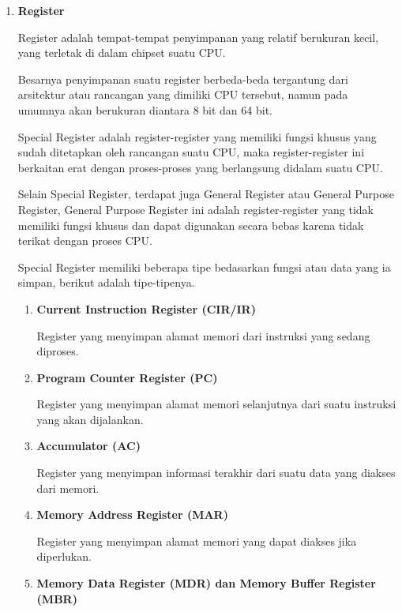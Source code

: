 \begin{enumerate}[label=\alph*.]

  \item \textbf{Register}

    Register adalah tempat-tempat penyimpanan yang relatif berukuran kecil,
    yang terletak di dalam chipset suatu CPU.

    Besarnya penyimpanan suatu register berbeda-beda tergantung dari
    arsitektur atau rancangan yang dimiliki CPU tersebut, namun pada
    umumnya akan berukuran diantara 8 bit dan 64 bit.

    Special Register adalah register-register yang memiliki fungsi khusus yang
    sudah ditetapkan oleh rancangan suatu CPU, maka register-register ini
    berkaitan erat dengan proses-proses yang berlangsung didalam suatu CPU.

    Selain Special Register, terdapat juga General Register atau General Purpose
    Register, General Purpose Register ini adalah register-register yang tidak
    memiliki fungsi khusus dan dapat digunakan secara bebas karena tidak terikat
    dengan proses CPU.

    Special Register memiliki beberapa tipe bedasarkan fungsi atau data yang
    ia simpan, berikut adalah tipe-tipenya.

    \begin{enumerate}[label=\roman*.]

      \item \textbf{Current Instruction Register (CIR/IR)}

        Register yang menyimpan alamat memori dari instruksi yang
        sedang diproses.

      \item \textbf{ Program Counter Register  (PC) }

        Register yang menyimpan alamat memori selanjutnya dari suatu instruksi
        yang akan dijalankan.

      \item \textbf{Accumulator (AC)}

        Register yang menyimpan informasi terakhir dari suatu data yang diakses
        dari memori.

      \item \textbf{Memory Address Register (MAR)}

        Register yang menyimpan alamat memori yang dapat diakses jika diperlukan.

      \item \textbf{Memory Data Register (MDR) dan Memory Buffer Register (MBR)}


\end{enumerate}
\end{enumerate}
